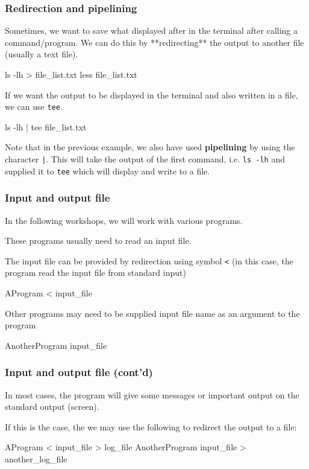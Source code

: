\documentclass[english,11pt]{beamer}
\begin{document}
\begin{frame}[fragile]
\frametitle{Redirection and pipelining}

Sometimes, we want to save what displayed after in the terminal after
calling a command/program. We can do this by **redirecting** the output
to another file (usually a text file).
\begin{bashcode}
ls -lh > file_list.txt
less file_list.txt
\end{bashcode}

If we want the output to be displayed in the terminal and also written
in a file, we can use \verb|tee|.
\begin{bashcode}
ls -lh | tee file_list.txt
\end{bashcode}
Note that in the previous example, we also have used \textbf{pipelining} by
using the character \texttt{|}. This will take the output of the first command,
i.e. \verb|ls -lh| and supplied it to \verb|tee| which will display and write
to a file.

\end{frame}



\begin{frame}[fragile]
\frametitle{Input and output file}

In the following workshops, we will work with various programs.

These programs usually need to read an input file.

The input file can be provided by redirection using symbol \verb|<| (in this
case, the program read the input file from standard input)
\begin{bashcode}
AProgram < input_file
\end{bashcode}

Other programs may need to be supplied input file name as an argument to
the program
\begin{bashcode}
AnotherProgram input_file
\end{bashcode}
\end{frame}


\begin{frame}[fragile]
\frametitle{Input and output file (cont'd)}

In most cases, the program will give some messages or important output on
the standard output (screen).

If this is the case, the we may use the following to redirect the output
to a file:
\begin{bashcode}
AProgram < input_file > log_file
AnotherProgram input_file > another_log_file
\end{bashcode}

\end{frame}
\end{document}
